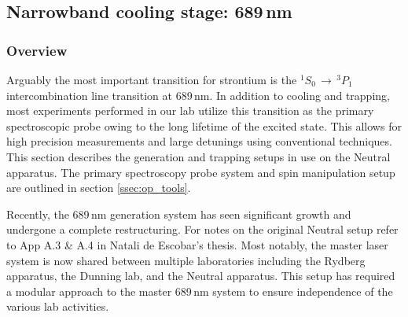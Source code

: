 \pagebreak
\subsection{Narrowband cooling stage: 689\,nm} \label{ssec:689sys}
\subsubsection{Overview}
Arguably the most important transition for strontium is the $^1S_0\,\rightarrow\,^3P_1$ intercombination line transition at 689\,nm.
In addition to cooling and trapping, most experiments performed in our lab utilize this transition as the primary spectroscopic probe owing to the long lifetime of the excited state.
This allows for high precision measurements and large detunings using conventional techniques.
This section describes the generation and trapping setups in use on the Neutral apparatus.
The primary spectroscopy probe system and spin manipulation setup are outlined in section \ref{ssec:op_tools}.

Recently, the 689\,nm generation system has seen significant growth and undergone a complete restructuring. 
For notes on the original Neutral setup refer to App A.3 \& A.4 in Natali de Escobar's thesis.
Most notably, the master laser system is now shared between multiple laboratories including the Rydberg apparatus, the Dunning lab, and the Neutral apparatus.
This setup has required a modular approach to the master 689\,nm system to ensure independence of the various lab activities.

